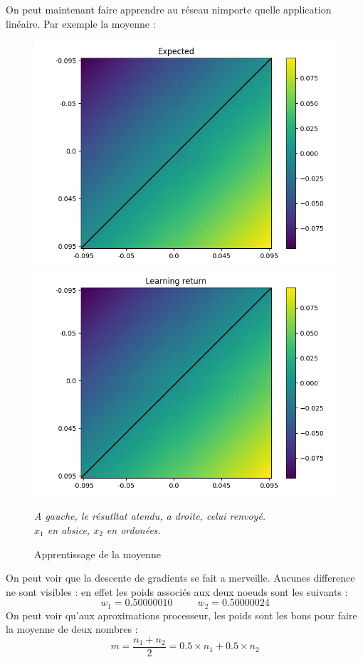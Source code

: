 
On peut maintenant faire apprendre au réseau nimporte quelle application linéaire.
Par exemple la moyenne :

\begin{figure}[H]
    \center
    \includegraphics[height=\petit]{pict/moy/expected}
    \includegraphics[height=\petit]{pict/moy/result}
	\caption{Apprentissage de la moyenne}
    \begin{center}
        \textit{
        A gauche, le résutltat atendu, a droite, celui renvoyé.\\
        $x_1$ en absice, $x_2$ en ordonées.
        }
    \end{center}
	\label{fig:moy}
\end{figure}
\vspace{-12pt}

On peut voir que la descente de gradients se fait a merveille.
Aucunes difference ne sont visibles : en effet les poids associés aux deux noeuds sont les suivants :
\begin{equation*}
    w_1 = 0.50000010
    \;\;\;\;\;\;\;\;\;
    w_2 = 0.50000024
\end{equation*}
On peut voir qu'aux aproximations processeur, les poids sont les bons pour faire la moyenne de deux nombres :
\begin{equation*}
    m =\frac{n_1 + n_2}{2} = 0.5 \times n_1 + 0.5 \times n_2
\end{equation*}
